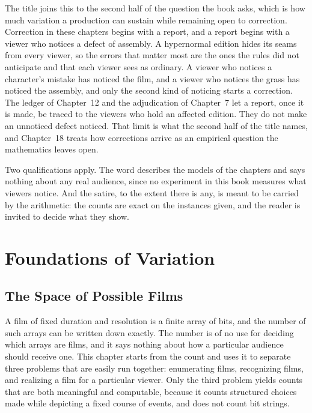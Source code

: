 \documentclass[11pt,twoside,openright]{book}
\theoremstyle{plain}
\theoremstyle{definition}
\theoremstyle{remark}
\begin{document}
The title joins this to the second half of the question the book asks, which is how much variation a production can sustain while remaining open to correction. Correction in these chapters begins with a report, and a report begins with a viewer who notices a defect of assembly. A hypernormal edition hides its seams from every viewer, so the errors that matter most are the ones the rules did not anticipate and that each viewer sees as ordinary. A viewer who notices a character's mistake has noticed the film, and a viewer who notices the grass has noticed the assembly, and only the second kind of noticing starts a correction. The ledger of Chapter~12 and the adjudication of Chapter~7 let a report, once it is made, be traced to the viewers who hold an affected edition. They do not make an unnoticed defect noticed. That limit is what the second half of the title names, and Chapter~18 treats how corrections arrive as an empirical question the mathematics leaves open.

Two qualifications apply. The word describes the models of the chapters and says nothing about any real audience, since no experiment in this book measures what viewers notice. And the satire, to the extent there is any, is meant to be carried by the arithmetic: the counts are exact on the instances given, and the reader is invited to decide what they show.

\part{Foundations of Variation}

\chapter{The Space of Possible Films}
\label{ch:space}

A film of fixed duration and resolution is a finite array of bits, and the number of such arrays can be written down exactly. The number is of no use for deciding which arrays are films, and it says nothing about how a particular audience should receive one. This chapter starts from the count and uses it to separate three problems that are easily run together: enumerating films, recognizing films, and realizing a film for a particular viewer. Only the third problem yields counts that are both meaningful and computable, because it counts structured choices made while depicting a fixed course of events, and does not count bit strings.
\end{document}
